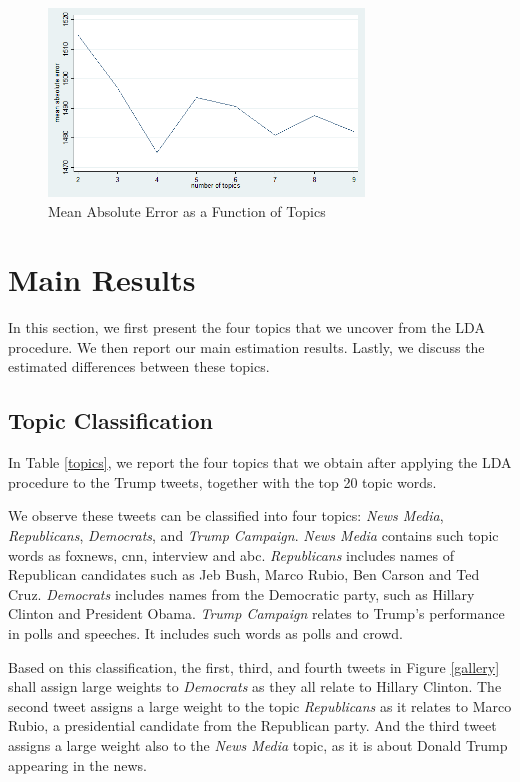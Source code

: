 \documentclass[letterpaper]{article}
\begin{document}
\begin{figure}[H]
\caption{Mean Absolute Error as a Function of Topics}
\label{mae}
\includegraphics[height=5cm]{mae_revised.png}
\end{figure}

\section{Main Results}
In this section, we first present the four topics that we uncover from the LDA procedure. We then report our main estimation results. Lastly, we discuss the estimated differences between these topics.

\subsection{Topic Classification}
In Table \ref{topics}, we report the four topics that we obtain after applying the LDA procedure to the Trump tweets, together with the top 20 topic words.

We observe these tweets can be classified into four topics: \textit{News Media}, \textit{Republicans}, \textit{Democrats}, and \textit{Trump Campaign}. \textit{News Media} contains such topic words as foxnews, cnn, interview and abc. \textit{Republicans} includes names of Republican candidates such as Jeb Bush, Marco Rubio, Ben Carson and Ted Cruz. \textit{Democrats} includes names from the Democratic party, such as Hillary Clinton and President Obama. \textit{Trump Campaign} relates to Trump's performance in polls and speeches. It includes such words as polls and crowd.

Based on this classification, the first, third, and fourth tweets in Figure \ref{gallery} shall assign large weights to \textit{Democrats} as they all relate to Hillary Clinton. The second tweet assigns a large weight to the topic \textit{Republicans} as it relates to Marco Rubio, a presidential candidate from the Republican party. And the third tweet assigns a large weight  also to the \textit{News Media} topic, as it is about Donald Trump appearing in the news.
\end{document}
